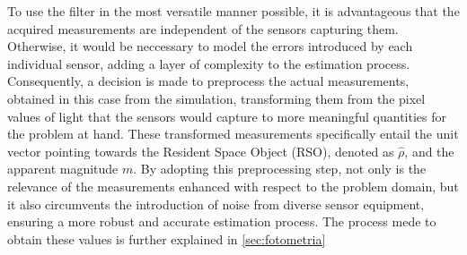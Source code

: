 To use the filter in the most versatile manner possible, it is advantageous that the acquired measurements are independent of the sensors capturing them. Otherwise, it would be neccessary to model the errors introduced by each individual sensor, adding a layer of complexity to the estimation process. Consequently, a decision is made to preprocess the actual measurements, obtained in this case from the simulation, transforming them from the pixel values of light that the sensors would capture to more meaningful quantities for the problem at hand. These transformed measurements specifically entail the unit vector pointing towards the Resident Space Object (RSO), denoted as $\hat{\rho}$, and the apparent magnitude $m$. By adopting this preprocessing step, not only is the relevance of the measurements enhanced with respect to the problem domain, but it also circumvents the introduction of noise from diverse sensor equipment, ensuring a more robust and accurate estimation process. The process mede to obtain these values is further explained in \autoref{sec:fotometria}














